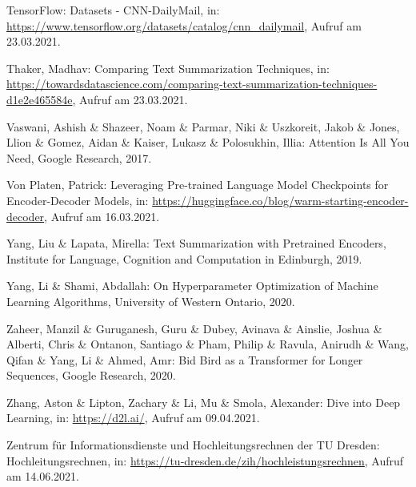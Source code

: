 \begin{thebibliography}{116}
TensorFlow: Datasets - CNN-DailyMail, in: \url{https://www.tensorflow.org/datasets/catalog/cnn_dailymail}, Aufruf am 23.03.2021.

Thaker, Madhav: Comparing Text Summarization Techniques, in: \url{https://towardsdatascience.com/comparing-text-summarization-techniques-d1e2e465584e}, Aufruf am 23.03.2021.

Vaswani, Ashish \& Shazeer, Noam \& Parmar, Niki \& Uszkoreit, Jakob \& Jones, Llion \& Gomez, Aidan \& Kaiser, Lukasz \& Polosukhin, Illia: Attention Is All You Need, Google Research, 2017.

Von Platen, Patrick: Leveraging Pre-trained Language Model Checkpoints for Encoder-Decoder Models, in: \url{https://huggingface.co/blog/warm-starting-encoder-decoder}, Aufruf am 16.03.2021.

Yang, Liu \& Lapata, Mirella: Text Summarization with Pretrained Encoders, Institute for Language, Cognition and Computation in Edinburgh, 2019.

Yang, Li \& Shami, Abdallah: On Hyperparameter Optimization of Machine Learning Algorithms, University of Western Ontario, 2020.

Zaheer, Manzil \& Guruganesh, Guru \& Dubey, Avinava \& Ainslie, Joshua \& Alberti, Chris \& Ontanon, Santiago \& Pham, Philip \& Ravula, Anirudh \& Wang, Qifan \& Yang, Li \& Ahmed, Amr: Bid Bird as a Transformer for Longer Sequences, Google Research, 2020.

Zhang, Aston \& Lipton, Zachary \& Li, Mu \& Smola, Alexander: Dive into Deep Learning, in: \url{https://d2l.ai/}, Aufruf am 09.04.2021.

Zentrum für Informationsdienste und Hochleitungsrechnen der TU Dresden: Hochleitungsrechnen, in: \url{https://tu-dresden.de/zih/hochleistungsrechnen}, Aufruf am 14.06.2021.

\end{thebibliography}
